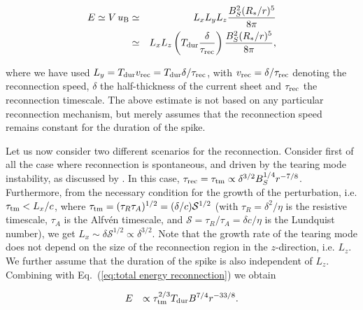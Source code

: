 \documentclass[12pt]{emulateapj}
\begin{document}
\begin{eqnarray}\label{eq:total energy reconnection}
E\simeq V\,u_{\rm B} & \simeq &  L_xL_yL_z\frac{B_S^2(R_*/r)^5}{8\pi} \\ \nonumber
				 & \simeq & L_xL_z\left(T_{\rm dur}\frac{\delta}{\tau_{\rm rec}}\right)\frac{B_S^2(R_*/r)^5}{8\pi},
\end{eqnarray}

where we have used $L_y=T_{\rm dur}v_{\rm rec}=T_{\rm dur}\delta/\tau_{\rm rec}$, with $v_{\rm rec}=\delta/\tau_{\rm rec}$ denoting the reconnection 
speed, $\delta$ the half-thickness of the current sheet and $\tau_{\rm rec}$ the reconnection timescale. The above estimate is not based on any particular 
reconnection mechanism, but merely assumes that the reconnection speed remains constant for the duration of the spike. 

Let us now consider two different scenarios for the reconnection. Consider first of all the case where reconnection is spontaneous, and driven by the 
tearing mode instability, as discussed by \citet{lyutikov2003}. In this case, $\tau_{\rm rec}=\tau_{\rm tm}\propto\delta^{3/2}B_S^{1/4}r^{-7/8}$. Furthermore, 
from the necessary condition for the growth of the perturbation, i.e. $\tau_{\rm tm}<L_x/c$, where $\tau_{\rm tm}=(\tau_R\tau_A)^{1/2}=(\delta/c)\mathcal{S}^{1/2}$ 
(with $\tau_R=\delta^2/\eta$ is the resistive timescale, $\tau_A$ is the Alfv\'en timescale, and 
$\mathcal{S}=\tau_R/\tau_A=\delta c/\eta$ is the Lundquist number), we get $L_x\sim\delta\mathcal{S}^{1/2}\propto\delta^{3/2}$. Note that the 
growth rate of the tearing mode does not depend on the size of the reconnection region in the $z$-direction, i.e. $L_z$. We further assume that the duration 
of the spike is also independent of $L_z$. Combining with Eq.~(\ref{eq:total energy reconnection}) we obtain

\begin{eqnarray}\label{eq}
&E &\propto\tau_{\rm tm}^{2/3}T_{\rm dur}B^{7/4}r^{-33/8}. 
\end{eqnarray}
\end{document}
